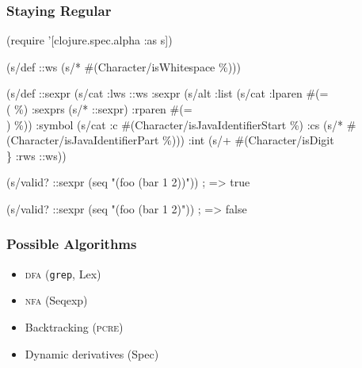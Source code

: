 \documentclass{beamer}
\begin{document}

\begin{frame}[fragile]
\frametitle{Staying Regular}

{\scriptsize
\begin{semiverbatim}
(require '[clojure.spec.alpha :as s])

(s/def ::ws (s/* \#(Character/isWhitespace \%)))

(s/def ::sexpr
  (s/cat
    :lws ::ws
    :sexpr (s/alt
             :list (s/cat :lparen \#(= \\( \%)
                          :sexprs (s/* ::sexpr)
                          :rparen #(= \\) \%))
             :symbol (s/cat :c #(Character/isJavaIdentifierStart \%)
                            :cs (s/* #(Character/isJavaIdentifierPart \%)))
             :int (s/+ \#(Character/isDigit \\\}%
    :rws ::ws))

(s/valid? ::sexpr (seq "(foo (bar 1 2))"))
; => true

(s/valid? ::sexpr (seq "(foo (bar 1 2)"))
; => false
\end{semiverbatim}
}

\end{frame}


\begin{frame}
\frametitle{Possible Algorithms}

\begin{itemize}
\item \textsc{dfa} (\texttt{grep}, Lex)
\item \textsc{nfa} (Seqexp)
\item Backtracking (\textsc{pcre})
\item Dynamic derivatives (Spec)
\end{itemize}

\end{frame}

\end{document}
